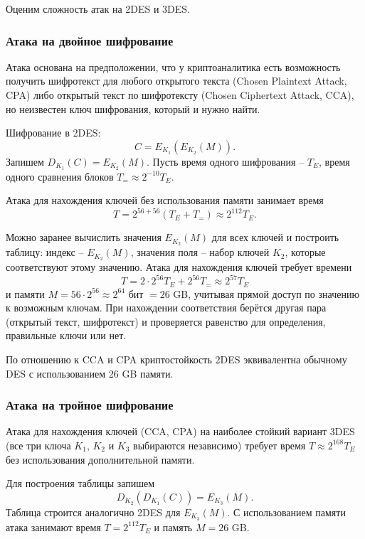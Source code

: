 Оценим сложность атак на 2DES и 3DES.

\subsubsection{Атака на двойное шифрование}


Атака основана на предположении, что у криптоаналитика есть возможность получить шифротекст для любого открытого текста (Chosen Plaintext Attack, CPA) либо открытый текст по шифротексту (Chosen Ciphertext Attack, CCA), но неизвестен ключ шифрования, который и нужно найти.

Шифрование в 2DES:
    \[ C = E_{K_1}( E_{K_2}(M)). \]
Запишем $D_{K_1}(C) = E_{K_2}(M)$. Пусть время одного шифрования -- $T_E$, время одного сравнения блоков $T_{=} \approx 2^{-10} T_E$.

Атака для нахождения ключей без использования памяти занимает время
    \[ T = 2^{56 + 56} (T_E + T_{=}) \approx 2^{112} T_E. \]

Можно заранее вычислить значения $E_{K_2}(M)$ для всех ключей и построить таблицу: индекс -- $E_{K_2}(M)$, значения поля -- набор ключей $K_2$, которые соответствуют этому значению. Атака для нахождения ключей требует времени
    \[ T = 2 \cdot 2^{56} T_E + 2^{56} T_{=} \approx 2^{57} T_E \]
и памяти $M = 56 \cdot 2^{56} \approx 2^{64}$ бит $= 26$ GB, учитывая прямой доступ по значению к возможным ключам. При нахождении соответствия берётся другая пара (открытый текст, шифротекст) и проверяется равенство для определения, правильные ключи или нет.

По отношению к CCA и CPA криптостойкость 2DES эквивалентна обычному DES с использованием 26 GB памяти.

\subsubsection{Атака на тройное шифрование}

Атака для нахождения ключей (CCA, CPA) на наиболее стойкий вариант 3DES (все три ключа $K_1$, $K_2$ и $K_3$ выбираются независимо) требует время $T \approx 2^{168} T_E$ без использования дополнительной памяти.

Для построения таблицы запишем
    \[ D_{K_2}( D_{K_1}( C)) = E_{K_3} (M). \]
Таблица строится аналогично 2DES для $E_{K_3}(M)$. С использованием памяти атака занимают время $T = 2^{112} T_E$ и память $M = 26$ GB.
